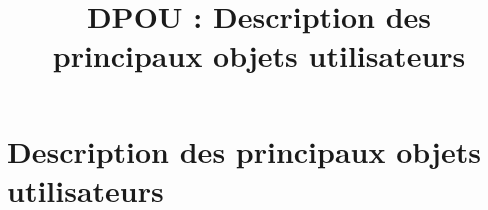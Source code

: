 

\title{DPOU : Description des principaux objets utilisateurs}


\maketitle
\tableofcontents
\newpage

\part{Description des principaux objets utilisateurs}

\newpage


